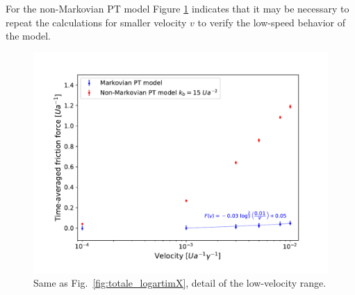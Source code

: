 For the non-Markovian PT model Figure \ref{fig:low_velocities} indicates that it may be necessary to repeat the calculations for smaller velocity $v$ to verify the low-speed behavior of the model.
\begin{figure}
    \centering
    \includegraphics[width=\textwidth]{lowvelocities.pdf}
    \caption{Same as Fig.~\ref{fig:totale_logartimX}, detail of the low-velocity range.}
    \label{fig:low_velocities}
\end{figure}
